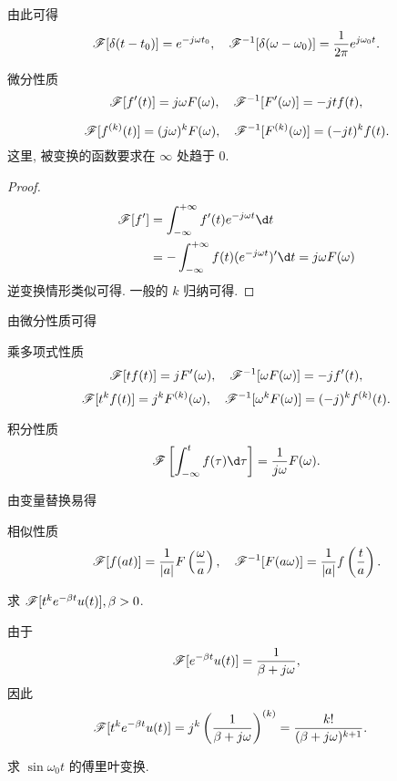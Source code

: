 由此可得
\[\mathscr{F}[\delta(t-t_0)]=e^{-j\omega t_0},\quad
\mathscr{F}^{-1}[\delta(\omega-\omega_0)]=\dfrac1{2\pi}e^{j\omega_0 t}.\]

\begin{theorem}{微分性质}
	\[\mathscr{F}[f'(t)]=j\omega F(\omega),\quad
	\mathscr{F}^{-1}[F'(\omega)]=-jtf(t),\]

	\[\mathscr{F}[f^{(k)}(t)]=(j\omega)^k F(\omega),\quad
	\mathscr{F}^{-1}[F^{(k)}(\omega)]=(-jt)^kf(t).\]
	这里, 被变换的函数要求在 $\infty$ 处趋于 $0$.
\end{theorem}

\begin{proof}
	\begin{align*}
		\msf[f']&=\int_{-\infty}^{+\infty}f'(t)e^{-j\omega t}\d t\\
		&=-\int_{-\infty}^{+\infty}f(t)(e^{-j\omega t})'\d t=j\omega F(\omega)
	\end{align*}
	{逆变换情形类似可得. 一般的 $k$ 归纳可得.\qedhere}
\end{proof}

由微分性质可得
\begin{theorem}{乘多项式性质}
	\[\mathscr{F}[tf(t)]=jF'(\omega),\quad
	\mathscr{F}^{-1}[\omega F(\omega)]=-jf'(t),\]
	\[\mathscr{F}[t^kf(t)]=j^kF^{(k)}(\omega),\quad
	\mathscr{F}^{-1}[\omega^kF(\omega)]=(-j)^kf^{(k)}(t).\]
\end{theorem}

\begin{theorem}{积分性质}
	\[\msf\left[\int_{-\infty}^t f(\tau)\d\tau\right]=\frac1{j\omega}F(\omega).\]
\end{theorem}

由变量替换易得
\begin{theorem}{相似性质}
	\[\mathscr{F}[f(at)]=\frac1{|a|}F\left(\frac\omega a\right),\quad
	\mathscr{F}^{-1}[F(a\omega)]=\frac1{|a|}f\left(\frac t a\right).\]
\end{theorem}

\begin{example}
	求 $\mathscr{F}[t^k e^{-\beta t}u(t)],\beta>0$.
\end{example}

\begin{solution}
		由于
		\[\mathscr{F}[e^{-\beta t}u(t)]=\frac{1}{\beta+j\omega},\]
	{因此
		\begin{align*}
			\mathscr{F}[t^ke^{-\beta t}u(t)]&=j^k\left(\frac1{\beta+j\omega}\right)^{(k)}
			=\frac{k!}{(\beta+j\omega)^{k+1}}.
		\end{align*}
	}
\end{solution}

\begin{example}
	求 $\sin{\omega_0 t}$ 的傅里叶变换.
\end{example}

